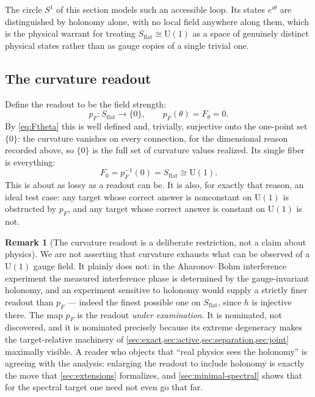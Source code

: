 \documentclass[11pt,reqno]{amsart}
\theoremstyle{plain}
\theoremstyle{definition}
\newtheorem{remark}[theorem]{Remark}
\newcommand{\Uone}{\mathrm{U}(1)}
\newcommand{\Src}{S}
\begin{document}
The circle $S^1$ of this section models such an accessible loop. Its states $e^{i\theta}$ are
distinguished by holonomy alone, with no local field anywhere along them, which is the physical
warrant for treating $\Src_{\mathrm{flat}}\cong\Uone$ as a space of genuinely distinct physical
states rather than as gauge copies of a single trivial one.

\subsection{The curvature readout}

Define the readout to be the field strength:
\begin{equation}\label{eq:pF}
p_F\colon\Src_{\mathrm{flat}}\longrightarrow\{0\},
\qquad
p_F(\theta)=F_\theta=0 .
\end{equation}
By \eqref{eq:Ftheta} this is well defined and, trivially, surjective onto the one-point set
$\{0\}$: the curvature vanishes on every connection, for the dimensional reason recorded above,
so $\{0\}$ is the full set of curvature values realized. Its single fiber is everything:
\begin{equation}\label{eq:pF-fiber}
F_{0}=p_F^{-1}(0)=\Src_{\mathrm{flat}}\cong\Uone .
\end{equation}
This is about as lossy as a readout can be. It is also, for exactly that reason, an ideal test
case: any target whose correct answer is nonconstant on $\Uone$ is obstructed by $p_F$, and any
target whose correct answer is constant on $\Uone$ is not.

\begin{remark}[The curvature readout is a deliberate restriction, not a claim about
physics]\label{rem:curvature-restricted}
We are not asserting that curvature exhausts what can be observed of a $\Uone$ gauge field. It
plainly does not: in the Aharonov--Bohm interference experiment the measured interference phase is
determined by the gauge-invariant holonomy, and an experiment sensitive to holonomy would supply
a strictly finer readout than $p_F$ --- indeed
the finest possible one on $\Src_{\mathrm{flat}}$, since $h$ is injective there. The map $p_F$ is
the readout \emph{under examination}. It is nominated, not discovered, and it is nominated
precisely because its extreme degeneracy makes the target-relative machinery of
\cref{sec:exact,sec:active,sec:separation,sec:joint} maximally visible. A reader who objects that
``real physics sees the holonomy'' is agreeing with the analysis: enlarging the readout to
include holonomy is exactly the move that \cref{sec:extensions} formalizes, and
\cref{sec:minimal-spectral} shows that for the spectral target one need not even go that far.
\end{remark}
\end{document}
